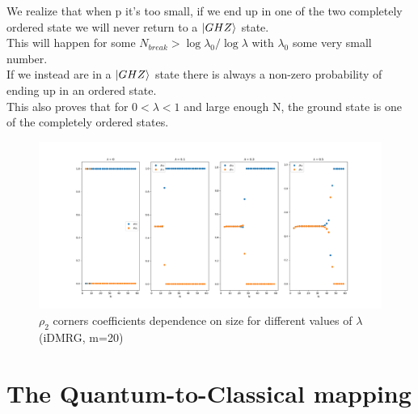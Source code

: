 \documentclass[12pt,a4paper]{article}
\begin{document}
We realize that when p it's too small, if we end up in one of the two completely ordered state we will never return to a $\ket{GHZ}$ state.\\
This will happen for some $N_{break}>\log\lambda_0  / \log \lambda $ with $\lambda_0$ some very small number.\\ If we instead are in a $\ket{GHZ}$ state there is always a non-zero probability of ending up in an ordered state.\\
This also proves that for $0<\lambda<1$ and large enough N, the ground state is one of the completely ordered states.
\begin{figure}[h]
	\hspace*{-4cm}
	\includegraphics[width=1.5\linewidth]{lambdaandsizes}
	\caption{$\rho_2$ corners coefficients dependence on size for different values of $\lambda$ (iDMRG, m=20) }
	\label{fig:lambdaandsizes}
\end{figure}
\section{The Quantum-to-Classical mapping}
\newpage
\appendix
\end{document}
